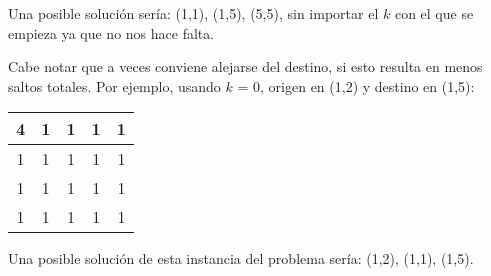 Una posible solución sería: (1,1), (1,5), (5,5), sin importar el $k$ con el que se empieza ya que no nos hace falta.

Cabe notar que a veces conviene alejarse del destino, si esto resulta en menos saltos totales. Por ejemplo, usando $k$ = 0, origen en (1,2) y destino en (1,5):
\begin{center}
\begin{tabular}{|c|c|c|c|c|}
\hline
 4 & 1 & 1 & 1 & 1 \\
 \hline
 1 & 1 & 1 & 1 & 1 \\
 \hline
 1 & 1 & 1 & 1 & 1 \\
 \hline
 1 & 1 & 1 & 1 & 1 \\
 \hline
\end{tabular}
\end{center}

Una posible solución de esta instancia del problema sería: (1,2), (1,1), (1,5).